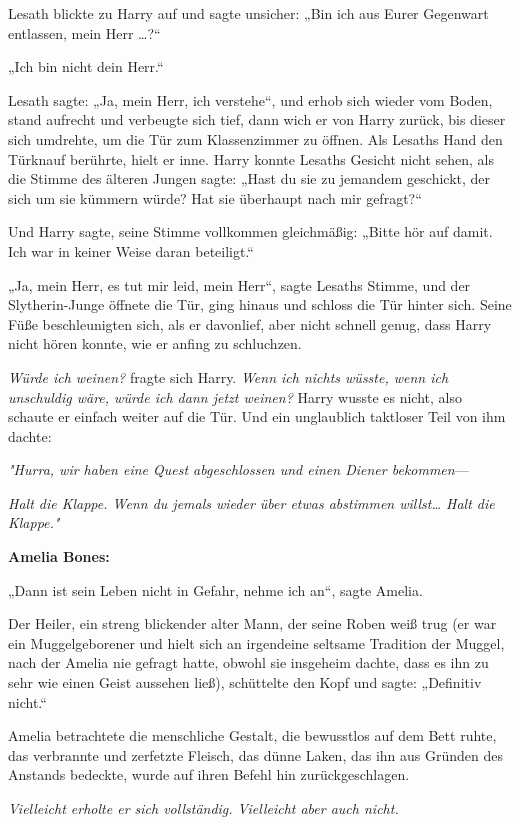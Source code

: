 {Lesath blickte zu Harry auf und sagte unsicher: „Bin ich aus Eurer Gegenwart entlassen, mein Herr …?“

„Ich bin nicht dein Herr.“

Lesath sagte: „Ja, mein Herr, ich verstehe“, und erhob sich wieder vom Boden, stand aufrecht und verbeugte sich tief, dann wich er von Harry zurück, bis dieser sich umdrehte, um die Tür zum Klassenzimmer zu öffnen. Als Lesaths Hand den Türknauf berührte, hielt er inne. Harry konnte Lesaths Gesicht nicht sehen, als die Stimme des älteren Jungen sagte: „Hast du sie zu jemandem geschickt, der sich um sie kümmern würde? Hat sie überhaupt nach mir gefragt?“

Und Harry sagte, seine Stimme vollkommen gleichmäßig: „Bitte hör auf damit. Ich war in keiner Weise daran beteiligt.“

„Ja, mein Herr, es tut mir leid, mein Herr“, sagte Lesaths Stimme, und der Slytherin-Junge öffnete die Tür, ging hinaus und schloss die Tür hinter sich. Seine Füße beschleunigten sich, als er davonlief, aber nicht schnell genug, dass Harry nicht hören konnte, wie er anfing zu schluchzen.

\emph{Würde ich weinen?} fragte sich Harry. \emph{Wenn ich nichts wüsste, wenn ich unschuldig wäre, würde ich dann jetzt weinen?} Harry wusste es nicht, also schaute er einfach weiter auf die Tür. Und ein unglaublich taktloser Teil von ihm dachte:

\emph{"Hurra, wir haben eine Quest abgeschlossen und einen Diener bekommen}—

\emph{Halt die Klappe. Wenn du jemals wieder über etwas abstimmen willst… Halt die Klappe."}

\textbf{Amelia Bones:}

„Dann ist sein Leben nicht in Gefahr, nehme ich an“, sagte Amelia.

Der Heiler, ein streng blickender alter Mann, der seine Roben weiß trug (er war ein Muggelgeborener und hielt sich an irgendeine seltsame Tradition der Muggel, nach der Amelia nie gefragt hatte, obwohl sie insgeheim dachte, dass es ihn zu sehr wie einen Geist aussehen ließ), schüttelte den Kopf und sagte: „Definitiv nicht.“

Amelia betrachtete die menschliche Gestalt, die bewusstlos auf dem Bett ruhte, das verbrannte und zerfetzte Fleisch, das dünne Laken, das ihn aus Gründen des Anstands bedeckte, wurde auf ihren Befehl hin zurückgeschlagen.

\emph{Vielleicht erholte er sich vollständig. Vielleicht aber auch nicht.}

}
